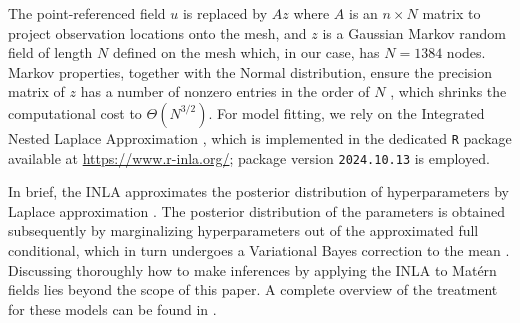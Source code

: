 \documentclass{article}%
\begin{document}
\begin{appendices}
The point-referenced field $u$ is replaced by $A z$ where $A$ is an $n \times N$ matrix to project observation locations onto the mesh, and $z$ is a Gaussian Markov random field of length $N$ defined on the mesh which, in our case, has $N = 1384$ nodes. Markov properties, together with the Normal distribution, ensure the precision matrix of $z$ has a number of nonzero entries in the order of $N$ \citep{GMRFs}, which shrinks the computational cost to $\Theta(N^{3/2})$. For model fitting, we rely on the Integrated Nested Laplace Approximation \citep[INLA][]{INLA}, which is implemented in the dedicated \texttt{R} package available at \url{https://www.r-inla.org/}; package version \texttt{2024.10.13} is employed.


 

In brief, %
the INLA approximates the posterior distribution of hyperparameters by Laplace approximation \citep{INLA}. The posterior distribution of the parameters is obtained subsequently by marginalizing hyperparameters out of the approximated full conditional, which in turn undergoes a Variational Bayes correction to the mean \citep{INLAVB}. Discussing thoroughly how to make inferences by applying the INLA to Matérn fields lies beyond the scope of this paper. A complete overview of the treatment for these models can be found in \cite{INLASPDE}.


\end{appendices}
\end{document}
